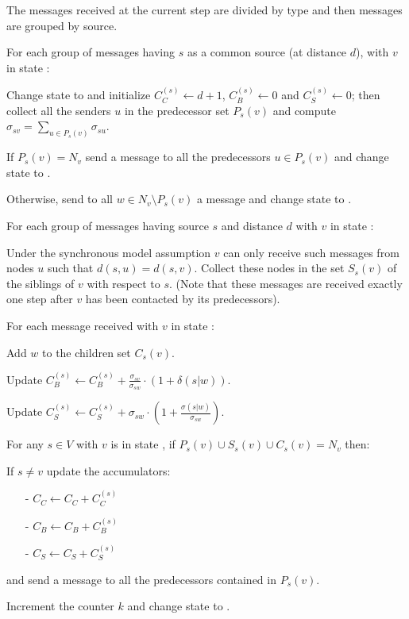 \begin{algosteps}
  \item The messages received at the current step are divided by type and then \mdisc{} messages are grouped by source.
  \item For each group of  messages having $s$ as a common source (at distance $d$), with $v$ in state :
  \begin{algosteps}
    \item Change state to  and initialize $C_C^{(s)} \gets d+1$, $C_B^{(s)} \gets 0$ and $C_S^{(s)} \gets 0$; then collect all the senders $u$ in the predecessor set $P_s(v)$ and compute $\sigma_{sv} = \sum_{u \in P_s(v)} \sigma_{su}$.
    \item If $P_s(v) = N_v$ send a  message to all the predecessors $u \in P_s(v)$ and change state to . 
    \item Otherwise, send to all $w \in N_v \setminus P_s(v)$ a  message and change state to .
  \end{algosteps}
    \item For each group of  messages having source $s$ and distance $d$ with $v$ in state :
    \begin{algosteps}
      \item Under the synchronous model assumption $v$ can only receive such messages from nodes $u$ such that $d(s,u) = d(s,v)$. Collect these nodes in the set $S_s(v)$ of the siblings of $v$ with respect to $s$. (Note that these messages are received exactly one step after $v$ has been contacted by its predecessors).
    \end{algosteps}
  \item For each  message received with $v$ in state :
  \begin{algosteps}
      \item Add $w$ to the children set $C_s(v)$.
      \item Update $C_B^{(s)} \gets C_B^{(s)} + \frac{\sigma_{sv}}{\sigma_{sw}} \cdot (1 + \delta(s|w))$.
      \item Update $C_S^{(s)} \gets C_S^{(s)} + \sigma_{sw} \cdot ( 1 + \frac{\sigma(s|w)}{\sigma_{sw}})$.
    \end{algosteps}
  \item For any $s \in V$ with $v$ is in state , if $P_s(v) \cup S_s(v) \cup C_s(v) = N_v$ then:
  \begin{algosteps}
      \item If $s \neq v$ update the accumulators:
      \begin{itemize}
        \item[-] $C_C \gets C_C + C_C^{(s)}$
        \item[-] $C_B \gets C_B + C_B^{(s)}$
        \item[-] $C_S \gets C_S + C_S^{(s)}$
      \end{itemize}
      and send a  message to all the predecessors contained in $P_s(v)$.
      \item Increment the counter $k$ and change state to .
    \end{algosteps}
\end{algosteps}
